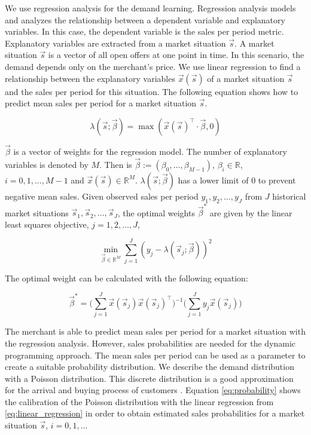 We use regression analysis for the demand learning.
Regression analysis models and analyzes the relationship between a dependent variable and explanatory variables.
In this case, the dependent variable is the sales per period metric.
Explanatory variables are extracted from a market situation $\vec{s}$.
A market situation $\vec{s}$ is a vector of all open offers at one point in time.
In this scenario, the demand depends only on the merchant's price.
We use linear regression to find a relationship between the explanatory variables $\vec{x}(\vec{s})$ of a market situation $\vec{s}$ and the sales per period for this situation.
The following equation shows how to predict mean sales per period for a market situation $\vec{s}$.

\begin{equation}
\label{eq:linear_regression}
\lambda(\vec{s}; \vec{\beta}) = \max(\vec{x}(\vec{s})^\intercal \cdot \vec{\beta}, 0)
\end{equation}

$\vec{\beta}$ is a vector of weights for the regression model.
The number of explanatory variables is denoted by $M$.
Then is $\vec{\beta} := (\beta_0, \ldots, \beta_{M-1})$, $\beta_i \in \mathbb{R}$, $i=0, 1, \ldots, M-1$ and $\vec{x}(\vec{s}) \in \mathbb{R}^M$.
$\lambda(\vec{s}; \vec{\beta})$ has a lower limit of 0 to prevent negative mean sales.
Given observed sales per period $y_1, y_2, \ldots, y_J$ from $J$ historical market situations $\vec{s}_1, \vec{s}_2, \ldots, \vec{s}_J$, the optimal weights $\vec{\beta}^*$ are given by the linear least squares objective, $j=1, 2, \ldots, J$,

\begin{equation}
 \min_{\vec{\beta} \in \mathbb{R}^M}{\sum_{j=1}^J
	{(y_j - \lambda(\vec{s}_j; \vec{\beta}))^2}
}
\label{eq:least_squares_objective}
\end{equation}

The optimal weight can be calculated with the following equation:

\begin{equation}
\vec{\beta}^* = \bigg(\sum_{j=1}^J{\vec{x}(\vec{s}_j) \vec{x}(\vec{s}_j)^\intercal} \bigg)^{-1}
			  \bigg(\sum_{j=1}^J{y_j \vec{x}(\vec{s}_j)} \bigg)
\end{equation}

The merchant is able to predict mean sales per period for a market situation with the regression analysis.
However, sales probabilities are needed for the dynamic programming approach.
The mean sales per period can be used as a parameter to create a suitable probability distribution.
We describe the demand distribution with a Poisson distribution.
This discrete distribution is a good approximation for the arrival and buying process of customers \cite{DBLP:journals/ior/Wolff82}.
Equation \cref{eq:probability} shows the calibration of the Poisson distribution with the linear regression from \cref{eq:linear_regression} in order to obtain estimated sales probabilities for a market situation $\vec{s}$, $i = 0,1,...$

